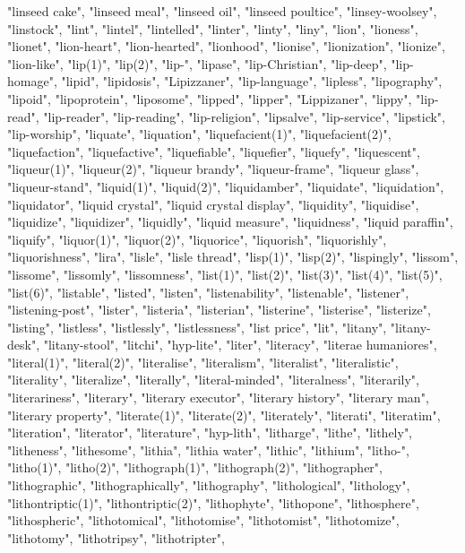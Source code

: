 "linseed cake",
"linseed meal",
"linseed oil",
"linseed poultice",
"linsey-woolsey",
"linstock",
"lint",
"lintel",
"lintelled",
"linter",
"linty",
"liny",
"lion",
"lioness",
"lionet",
"lion-heart",
"lion-hearted",
"lionhood",
"lionise",
"lionization",
"lionize",
"lion-like",
"lip(1)",
"lip(2)",
"lip-",
"lipase",
"lip-Christian",
"lip-deep",
"lip-homage",
"lipid",
"lipidosis",
"Lipizzaner",
"lip-language",
"lipless",
"lipography",
"lipoid",
"lipoprotein",
"liposome",
"lipped",
"lipper",
"Lippizaner",
"lippy",
"lip-read",
"lip-reader",
"lip-reading",
"lip-religion",
"lipsalve",
"lip-service",
"lipstick",
"lip-worship",
"liquate",
"liquation",
"liquefacient(1)",
"liquefacient(2)",
"liquefaction",
"liquefactive",
"liquefiable",
"liquefier",
"liquefy",
"liquescent",
"liqueur(1)",
"liqueur(2)",
"liqueur brandy",
"liqueur-frame",
"liqueur glass",
"liqueur-stand",
"liquid(1)",
"liquid(2)",
"liquidamber",
"liquidate",
"liquidation",
"liquidator",
"liquid crystal",
"liquid crystal display",
"liquidity",
"liquidise",
"liquidize",
"liquidizer",
"liquidly",
"liquid measure",
"liquidness",
"liquid paraffin",
"liquify",
"liquor(1)",
"liquor(2)",
"liquorice",
"liquorish",
"liquorishly",
"liquorishness",
"lira",
"lisle",
"lisle thread",
"lisp(1)",
"lisp(2)",
"lispingly",
"lissom",
"lissome",
"lissomly",
"lissomness",
"list(1)",
"list(2)",
"list(3)",
"list(4)",
"list(5)",
"list(6)",
"listable",
"listed",
"listen",
"listenability",
"listenable",
"listener",
"listening-post",
"lister",
"listeria",
"listerian",
"listerine",
"listerise",
"listerize",
"listing",
"listless",
"listlessly",
"listlessness",
"list price",
"lit",
"litany",
"litany-desk",
"litany-stool",
"litchi",
"hyp-lite",
"liter",
"literacy",
"literae humaniores",
"literal(1)",
"literal(2)",
"literalise",
"literalism",
"literalist",
"literalistic",
"literality",
"literalize",
"literally",
"literal-minded",
"literalness",
"literarily",
"literariness",
"literary",
"literary executor",
"literary history",
"literary man",
"literary property",
"literate(1)",
"literate(2)",
"literately",
"literati",
"literatim",
"literation",
"literator",
"literature",
"hyp-lith",
"litharge",
"lithe",
"lithely",
"litheness",
"lithesome",
"lithia",
"lithia water",
"lithic",
"lithium",
"litho-",
"litho(1)",
"litho(2)",
"lithograph(1)",
"lithograph(2)",
"lithographer",
"lithographic",
"lithographically",
"lithography",
"lithological",
"lithology",
"lithontriptic(1)",
"lithontriptic(2)",
"lithophyte",
"lithopone",
"lithosphere",
"lithospheric",
"lithotomical",
"lithotomise",
"lithotomist",
"lithotomize",
"lithotomy",
"lithotripsy",
"lithotripter",
